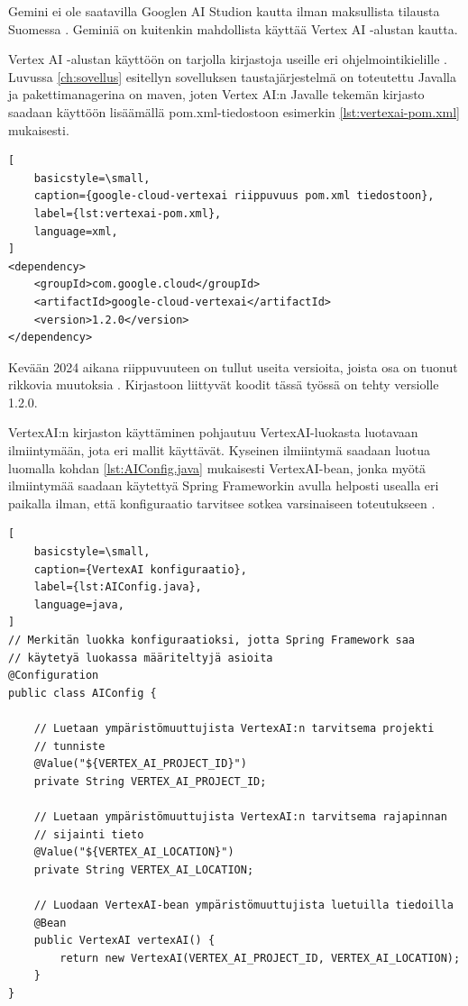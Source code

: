Gemini ei ole saatavilla Googlen AI Studion kautta ilman maksullista tilausta
Suomessa \parencite{googleAiAvailableRegions}. Geminiä on kuitenkin mahdollista
käyttää Vertex AI -alustan kautta.

Vertex AI -alustan käyttöön on tarjolla kirjastoja useille eri
ohjelmointikielille \parencite{vertexAiGenerativeAiQuickstart}. Luvussa
\ref{ch:sovellus} esitellyn sovelluksen taustajärjestelmä on toteutettu Javalla
ja pakettimanagerina on maven, joten Vertex AI:n Javalle tekemän kirjasto
saadaan käyttöön lisäämällä pom.xml-tiedostoon esimerkin
\ref{lst:vertexai-pom.xml} mukaisesti.

\begin{lstlisting}[
    basicstyle=\small,
    caption={google-cloud-vertexai riippuvuus pom.xml tiedostoon},
    label={lst:vertexai-pom.xml},
    language=xml,
]
<dependency>
    <groupId>com.google.cloud</groupId>
    <artifactId>google-cloud-vertexai</artifactId>
    <version>1.2.0</version>
</dependency>
\end{lstlisting}

Kevään 2024 aikana riippuvuuteen on tullut useita versioita, joista osa on
tuonut rikkovia muutoksia \parencite{mavenGoogleVertexAIAPI}. Kirjastoon
liittyvät koodit tässä työssä on tehty versiolle 1.2.0.

VertexAI:n kirjaston käyttäminen pohjautuu VertexAI-luokasta luotavaan
ilmiintymään, jota eri mallit käyttävät. Kyseinen ilmiintymä saadaan luotua
luomalla kohdan \ref{lst:AIConfig.java} mukaisesti VertexAI-bean, jonka myötä
ilmiintymää saadaan käytettyä Spring Frameworkin avulla helposti usealla eri
paikalla ilman, että konfiguraatio tarvitsee sotkea varsinaiseen toteutukseen
\parencite{baeldungSpringBean}.

\begin{lstlisting}[
    basicstyle=\small,
    caption={VertexAI konfiguraatio},
    label={lst:AIConfig.java},
    language=java,
]
// Merkitän luokka konfiguraatioksi, jotta Spring Framework saa
// käytetyä luokassa määriteltyjä asioita
@Configuration
public class AIConfig {

    // Luetaan ympäristömuuttujista VertexAI:n tarvitsema projekti
    // tunniste
    @Value("${VERTEX_AI_PROJECT_ID}")
    private String VERTEX_AI_PROJECT_ID;

    // Luetaan ympäristömuuttujista VertexAI:n tarvitsema rajapinnan
    // sijainti tieto
    @Value("${VERTEX_AI_LOCATION}")
    private String VERTEX_AI_LOCATION;

    // Luodaan VertexAI-bean ympäristömuuttujista luetuilla tiedoilla
    @Bean
    public VertexAI vertexAI() {
        return new VertexAI(VERTEX_AI_PROJECT_ID, VERTEX_AI_LOCATION);
    }
}
\end{lstlisting}

